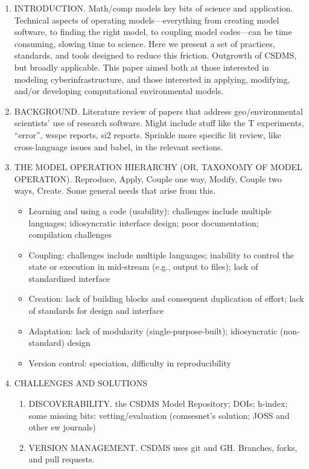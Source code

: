 \documentclass[12pt]{amsart}
\begin{document}
\begin{enumerate}
\item INTRODUCTION. Math/comp models key bits of science and application. Technical aspects of operating models---everything from creating model software, to finding the right model, to coupling model codes---can be time consuming, slowing time to science. Here we present a set of practices, standards, and tools designed to reduce this friction. Outgrowth of CSDMS, but broadly applicable. This paper aimed both at those interested in modeling cyberinfrastructure, and those interested in applying, modifying, and/or developing computational environmental models. 
\item BACKGROUND. Literature review of papers that address geo/environmental scientists' use of research software. Might include stuff like the T experiments, ``error'', wsspe reports, si2 reports. Sprinkle more specific lit review, like cross-language issues and babel, in the relevant sections.
\item THE MODEL OPERATION HIERARCHY (OR, TAXONOMY OF MODEL OPERATION). Reproduce, Apply, Couple one way, Modify, Couple two ways, Create. Some general needs that arise from this.
  \begin{itemize}
  \item Learning and using a code (usability): challenges include multiple languages; idiosyncratic interface design; poor documentation; compilation challenges
  \item Coupling: challenges include multiple languages; inability to control the state or execution in mid-stream (e.g., output to files); lack of standardized interface
  \item Creation: lack of building blocks and consequent duplication of effort; lack of standards for design and interface
  \item Adaptation: lack of modularity (single-purpose-built); idiosyncratic (non-standard) design
  \item Version control: speciation, difficulty in reproducibility
  \end{itemize}
\item CHALLENGES AND SOLUTIONS
  \begin{enumerate}
\item DISCOVERABILITY. the CSDMS Model Repository; DOIs; h-index; some missing bits: vetting/evaluation (comsesnet's solution; JOSS and other sw journals)
\item VERSION MANAGEMENT. CSDMS uses git and GH. Branches, forks, and pull requests.

\end{enumerate}
\end{enumerate}
\end{document}
